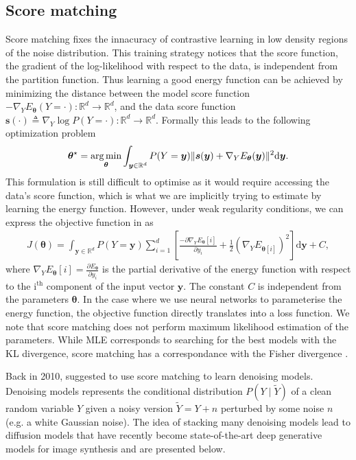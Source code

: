 \subsection{Score matching}
Score matching \citep{hyvarinen2005estimation} fixes the innacuracy of contrastive learning in low density regions of the noise distribution. This training strategy notices that the score function, the gradient of the log-likelihood with respect to the data, is independent from the partition function. Thus learning a good energy function can be achieved by minimizing the distance between the model score function $-\nabla_Y E_{\bm{\theta}}(Y=\cdot): \mathbb{R}^d \rightarrow \mathbb{R}^d$, and the data score function $\bm{s}(\cdot)\triangleq \nabla_Y \log P(Y=\cdot): \mathbb{R}^d \rightarrow \mathbb{R}^d$. Formally this leads to the following optimization problem
\begin{align}
  \bm{\theta}^{\star} = \operatorname*{arg\,min}_{\bm{\theta}} \int_{\bm{y} \in \mathbb{R}^d} P(Y=\bm{y}) \lVert \bm{s}(\bm{y}) + \nabla_Y E_{\bm{\theta}}(\bm{y})\rVert^2 \text{d}\bm{y}. \label{eq:score_matching}
\end{align}
This formulation is still difficult to optimise as it would require accessing the data's score function, which is what we are implicitly trying to estimate by learning the energy function. However, under weak regularity conditions, we can express the objective function in  as
\begin{align}
  J(\bm{\theta}) = \int_{\bm{y} \in \mathbb{R}^d} P(Y=\bm{y}) \sum_{i=1}^d \left[ \frac{-\partial \nabla_Y E_{\bm{\theta}}[i]}{\partial y_i } + \frac{1}{2} (\nabla_Y E_{\bm{\theta}[i]})^2 \right] \text{d}\bm{y} + C,
\end{align}
where $\nabla_Y E_{\bm{\theta}}[i] = \frac{\partial E_{\bm{\theta}}}{\partial y_i}$ is the partial derivative of the energy function with respect to the $\text{i}^{\text{th}}$ component of the input vector $\bm y$. The constant $C$ is independent from the parameters $\bm \theta$. In the case where we use neural networks to parameterise the energy function, the objective function directly translates into a loss function. We note that score matching does not perform maximum likelihood estimation of the parameters. While MLE corresponds to searching for the best models with the KL divergence, score matching has a correspondance with the Fisher divergence \citep{lyu2012interpretation}.

Back in 2010, \citet{vincent2011connection} suggested to use score matching to learn denoising models. Denoising models represents the conditional distribution $P(Y\mid \tilde Y)$ of a clean random variable $Y$ given a noisy version $\tilde{Y} = Y + n$ perturbed by some noise $n$ (e.g. a white Gaussian noise). The idea of stacking many denoising models lead to diffusion models that have recently become state-of-the-art deep generative models for image synthesis and are presented below.
